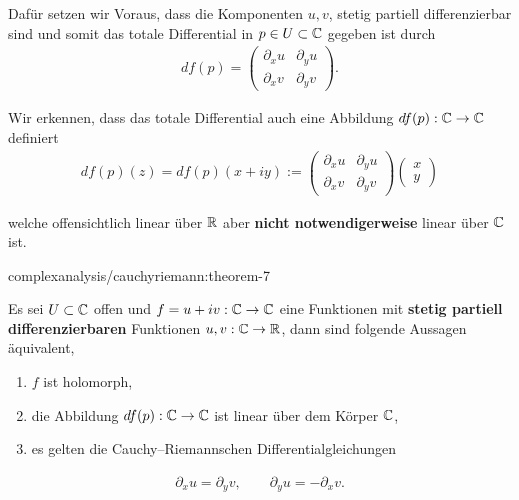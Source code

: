 \par
Dafür setzen wir Voraus, dass die Komponenten \(u,v\), stetig partiell differenzierbar sind und somit das totale Differential in \(p\in U\subset\mathbb{C}\) gegeben ist durch
\begin{align*}
df(p) = 
\begin{pmatrix} 
\partial_x u &\partial_y u\\
\partial_x v &\partial_y v
\end{pmatrix}.
\end{align*}
\par
Wir erkennen, dass das totale Differential auch eine Abbildung \(df(p):\mathbb{C}\to\mathbb{C}\) definiert
\begin{align*}
df(p)(z)= df(p)(x+iy):= 
\begin{pmatrix} 
\partial_x u &\partial_y u\\
\partial_x v &\partial_y v
\end{pmatrix}
\begin{pmatrix}
x\\y
\end{pmatrix}
\end{align*}
\par
welche offensichtlich linear über \(\mathbb{R}\) aber \textbf{nicht notwendigerweise} linear über \(\mathbb{C}\) ist.
\begin{theorem}{}{complexanalysis/cauchyriemann:theorem-7}



\par
Es sei \(U\subset \mathbb{C}\) offen und \(f=u+iv:\mathbb{C}\to\mathbb{C}\) eine Funktionen mit \textbf{stetig partiell differenzierbaren} Funktionen \(u,v:\mathbb{C}\to\mathbb{R}\), dann sind folgende Aussagen äquivalent,
\begin{enumerate}

\item {} 
\par
\(f\) ist holomorph,

\item {} 
\par
die Abbildung \(df(p):\mathbb{C}\to\mathbb{C}\) ist linear über dem Körper \(\mathbb{C}\),

\item {} 
\par
es gelten die Cauchy–Riemannschen Differentialgleichungen

\end{enumerate}
\begin{align*}
\partial_x u = \partial_y v, \qquad \partial_y u = -\partial_x v.
\end{align*}\end{theorem}

